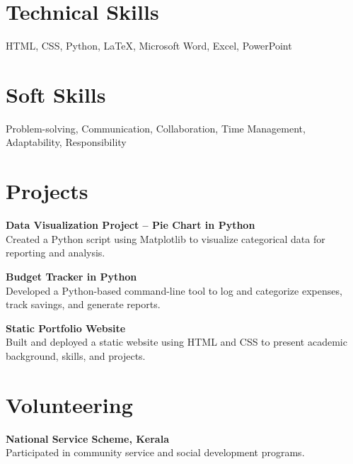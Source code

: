 \documentclass[10pt,a4paper]{article}
\begin{document}
\section*{Technical Skills}
HTML, CSS, Python, LaTeX, Microsoft Word, Excel, PowerPoint


\section*{Soft Skills}
Problem-solving, Communication, Collaboration, Time Management, Adaptability, Responsibility


\section*{Projects}
\textbf{Data Visualization Project – Pie Chart in Python} \\
Created a Python script using Matplotlib to visualize categorical data for reporting and analysis.

\vspace{0.3cm}
\textbf{Budget Tracker in Python} \\
Developed a Python-based command-line tool to log and categorize expenses, track savings, and generate reports.

\vspace{0.3cm}
\textbf{Static Portfolio Website} \\
Built and deployed a static website using HTML and CSS to present academic background, skills, and projects.


\section*{Volunteering}
\textbf{National Service Scheme, Kerala} \\
Participated in community service and social development programs.
\end{document}
